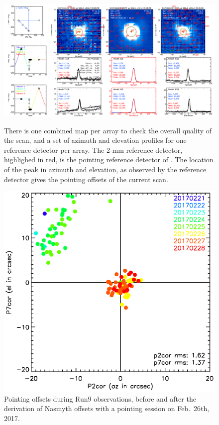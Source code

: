 \begin{figure}[p]
\begin{center}
\includegraphics[clip, angle=0, scale = 0.30]{Figures/plot_20170418s192.png}
\caption[Summary plots of the reduction of pointing scan.]{There is one combined
  map per array to check the overall quality of the scan, and a set of azimuth
  and elevation profiles for one reference detector per array. The 2-mm reference
  detector, highlighed in red, is the pointing reference detector of
  \nika. The location of the peak in azimuth and elevation, as observed by the
  reference detector gives the pointing offsets of the current scan.}
\label{fig:ptg}
\end{center}
\begin{center}
\includegraphics[clip, angle=0, scale = 0.70]{Figures/pointing_stats_N2R9.eps}
\caption[Pointing session results]{Pointing offsets during Run9 observations, before and after the
  derivation of Nasmyth offsets with a pointing session on Feb.~26th, 2017.}
\label{fig:pointing_stats_n2r9}
\end{center}
\end{figure}

